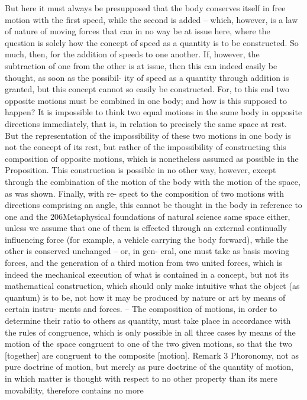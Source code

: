 But here it must always be presupposed that the body conserves itself
in free motion with the ﬁrst speed, while the second is added – which,
however, is a law of nature of moving forces that can in no way be at
issue here, where the question is solely how the concept of speed as a
quantity is to be constructed. So much, then, for the addition of speeds
to one another. If, however, the subtraction of one from the other is
at issue, then this can indeed easily be thought, as soon as the possibil-
ity of speed as a quantity through addition is granted, but this concept
cannot so easily be constructed. For, to this end two opposite motions
must be combined in one body; and how is this supposed to happen? It
is impossible to think two equal motions in the same body in opposite
directions immediately, that is, in relation to precisely the same space at
rest. But the representation of the impossibility of these two motions in
one body is not the concept of its rest, but rather of the impossibility of
constructing this composition of opposite motions, which is nonetheless
assumed as possible in the Proposition. This construction is possible in
no other way, however, except through the combination of the motion
of the body with the motion of the space, as was shown. Finally, with re-
spect to the composition of two motions with directions comprising an
angle, this cannot be thought in the body in reference to one and the
206Metaphysical foundations of natural science
same space either, unless we assume that one of them is effected through
an external continually inﬂuencing force (for example, a vehicle carrying
the body forward), while the other is conserved unchanged – or, in gen-
eral, one must take as basis moving forces, and the generation of a third
motion from two united forces, which is indeed the mechanical execution
of what is contained in a concept, but not its mathematical construction,
which should only make intuitive what the object (as quantum) is to be,
not how it may be produced by nature or art by means of certain instru-
ments and forces. – The composition of motions, in order to determine
their ratio to others as quantity, must take place in accordance with the
rules of congruence, which is only possible in all three cases by means
of the motion of the space congruent to one of the two given motions,
so that the two [together] are congruent to the composite [motion].
Remark 3
Phoronomy, not as pure doctrine of motion, but merely as pure doctrine
of the quantity of motion, in which matter is thought with respect to
no other property than its mere movability, therefore contains no more
